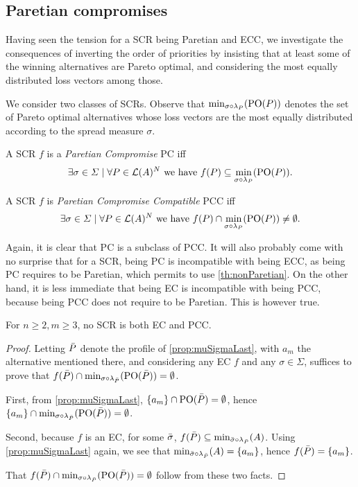 \documentclass[version=3.21, pagesize, twoside=off, bibliography=totoc, DIV=calc, fontsize=12pt, a4paper]{scrartcl}
\begin{document}
\subsection{Paretian compromises}
Having seen the tension for a \ac{SCR} being Paretian and ECC, we investigate the consequences of inverting the order of priorities by insisting that at least some of the winning alternatives are Pareto optimal, and considering the most equally distributed loss vectors among those.

We consider two classes of \acp{SCR}. 
Observe that $\mustar$ denotes the set of Pareto optimal alternatives whose loss vectors are the most equally distributed according to the spread measure $\sigma$.

\begin{definition} A \ac{SCR} $f$ is a \emph{Paretian Compromise} PC iff \[\exists \sigma \in \Sigma \suchthat \forall P \in \linors^N \text{ we have } f(P) \subseteq \mustar.\]
\end{definition}

\begin{definition} A \ac{SCR} $f$ is \emph{Paretian Compromise Compatible} PCC iff \[\exists \sigma \in \Sigma \suchthat \forall P \in \linors^N \text{ we have } f(P) \cap \mustar \neq \emptyset.\]
\end{definition}

Again, it is clear that PC is a subclass of PCC. It will also probably come with no surprise that for a \ac{SCR}, being PC is incompatible with being ECC, as being PC requires to be Paretian, which permits to use \cref{th:nonParetian}. On the other hand, it is less immediate that being EC is incompatible with
being PCC, because being PCC does not require to be Paretian. This is however true.

\begin{theorem} \label{th:incompatibility} 
	For $n ≥ 2, m ≥ 3$, no \ac{SCR} is both EC and PCC.
\end{theorem}
\begin{proof}	
	Letting $\bar{P}$ denote the profile of \cref{prop:muSigmaLast}, with $a_m$ the alternative mentioned there, and considering any EC $f$ and any $\sigma \in \Sigma$, suffices to prove that $f(\Ptop) \cap {\mustar[\sigma][\Ptop]} = \emptyset$.
	
	First, from \cref{prop:muSigmaLast}, $\{a_m\} \cap \text{PO}(\bar{P}) = \emptyset$, hence $\set{a_m} \cap {\mustar[\sigma][\Ptop]} = \emptyset$. 
	
	Second, because $f$ is an EC, for some $\bar{\sigma}$, $f(\Ptop) \subseteq {\musigma[\sigmatop][\Ptop]}$. Using \cref{prop:muSigmaLast} again, we see that ${\musigma[\sigmatop][\Ptop]} = \set{a_m}$, hence $f(\bar{P}) = \{a_m\}$.
	
	That $f(\Ptop) \cap {\mustar[\sigma][\Ptop]} = \emptyset$ follow from these two facts.
\end{proof}
\end{document}
